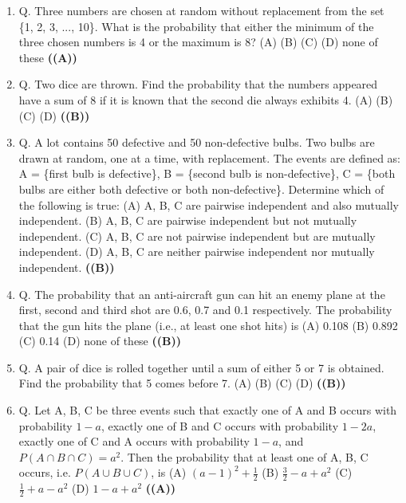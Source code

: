 \documentclass{article}
\begin{document}
\begin{enumerate}
are 3 : 1. Then P(B) satisfies
what is the range of P(B)?
(A) $0 \le P(B) \le \frac{1}{4}$
(B) $\frac{1}{12} \le P(B) \le \frac{1}{4}$
(C) $\frac{5}{12} \le P(B) \le \frac{3}{4}$
(D) $\frac{5}{12} \le P(B) \le 1$ \hfill \textbf{((C))}
\item Q. Three numbers are chosen at random without replacement from the set \{1, 2, 3, ..., 10\}.
What is the probability that either the minimum of the three chosen numbers is 4 or the
maximum is 8?
(A) 
(B) 
(C) 
(D) none of these \hfill \textbf{((A))}
\item Q. Two dice are thrown. Find the probability that the numbers appeared have a sum of 8
if it is known that the second die always exhibits 4.
(A) 
(B) 
(C) 
(D)  \hfill \textbf{((B))}
\item Q. A lot contains 50 defective and 50 non-defective bulbs. Two bulbs are drawn at random,
one at a time, with replacement. The events are defined as:
A = \{first bulb is defective\}, B = \{second bulb is non-defective\},
C = \{both bulbs are either both defective or both non-defective\}.
Determine which of the following is true:
(A) A, B, C are pairwise independent and also mutually independent.
(B) A, B, C are pairwise independent but not mutually independent.
(C) A, B, C are not pairwise independent but are mutually independent.
(D) A, B, C are neither pairwise independent nor mutually independent. \hfill \textbf{((B))}
\item Q. The probability that an anti-aircraft gun can hit an enemy plane at the first, second and
third shot are 0.6, 0.7 and 0.1 respectively. The probability that the gun hits the plane (i.e.,
at least one shot hits) is
(A) 0.108
(B) 0.892
(C) 0.14
(D) none of these \hfill \textbf{((B))}
\item Q. A pair of dice is rolled together until a sum of either 5 or 7 is obtained. Find the
probability that 5 comes before 7.
(A) 
(B) 
(C) 
(D)  \hfill \textbf{((B))}
\item Q. Let A, B, C be three events such that exactly one of A and B occurs with probability
$1 - a$, exactly one of B and C occurs with probability $1 - 2a$, exactly one of C and A occurs
with probability $1 - a$, and
$P(A \cap B \cap C) = a^2$.
Then the probability that at least one of A, B, C occurs, i.e. $P(A \cup B \cup C)$, is
(A) $(a-1)^2 + \frac{1}{2}$
(B) $\frac{3}{2} - a + a^2$
(C) $\frac{1}{2} + a - a^2$
(D) $1 - a + a^2$ \hfill \textbf{((A))}

\end{enumerate}
\end{document}
